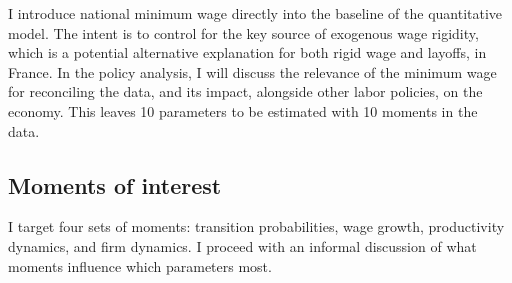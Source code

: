 I introduce national minimum wage directly into the baseline of the quantitative model. The intent is to control for the key source of exogenous wage rigidity, which is a potential alternative explanation for both rigid wage and layoffs, in France. In the policy analysis, I will discuss the relevance of the minimum wage for reconciling the data, and its impact, alongside other labor policies, on the economy.
This leaves 10 parameters to be estimated with 10 moments in the data.

\subsection{Moments of interest}
I target four sets of moments: transition probabilities, wage growth, productivity dynamics, and firm dynamics. I proceed with an informal discussion of what moments influence which parameters most.


